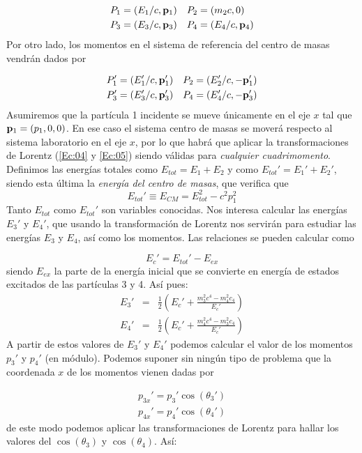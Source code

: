 \begin{eqnarray}
	P_1 = (E_1/c,\mathbf{p}_1) & \quad P_2 = (m_2c,0) \\
	P_3 = (E_3/c,\mathbf{p}_3) & \quad P_4 = (E_4/c,\mathbf{p}_4)
\end{eqnarray}
Por otro lado, los momentos en el sistema de referencia del centro de masas vendrán dados por

\begin{eqnarray}
	P_1' = (E_1'/c,\mathbf{p}_1') \quad P_2 = (E_2'/c,-\mathbf{p}_1') \\
	P_3' = (E_3'/c,\mathbf{p}_3') \quad P_4 = (E_4'/c,-\mathbf{p}_3')
\end{eqnarray}
Asumiremos que la partícula 1 incidente se mueve únicamente en el eje $x$ tal que $\mathbf{p}_1=(p_1,0,0)$. En ese caso el sistema centro de masas se moverá respecto al sistema laboratorio en el eje $x$, por lo que habrá que aplicar la transformaciones de Lorentz (\ref{Ec:04} y \ref{Ec:05}) siendo válidas para \textit{cualquier cuadrimomento}. Definimos las energías totales como $E_{tot}=E_1+E_2$ y como  $E_{tot}'=E_1'+E_2'$, siendo esta última la \textit{energía del centro de masas}, que verifica que
\begin{equation}
	E_{tot}' \equiv E_{CM} = E_{tot}^2 - c^2p_1^2 \label{Ec:18}
\end{equation}
Tanto $E_{tot}$ como $E_{tot}'$ son variables conocidas. Nos interesa calcular las energías $E_3'$ y $E_4'$, que usando la transformación de Lorentz nos servirán para estudiar las energías $E_3$ y $E_4$, así como los momentos. Las relaciones se pueden calcular como

\begin{equation}
	E_c' = E_{tot}' - E_{ex}
\end{equation}
siendo $E_{ex}$ la parte de la energía inicial que se convierte en energía de estados excitados de las partículas 3 y 4. Así pues:
\begin{eqnarray}
	E_3 ' & = & \frac{1}{2} \left( E_{c}' + \frac{m_3^2c^4- m_4^2c_4}{E_{c}'} \right) \\
	E_4 ' & = & \frac{1}{2} \left( E_{c}' + \frac{m_4^2c^4- m_3^2c_4}{E_{c}'} \right)
\end{eqnarray}
A partir de estos valores de $E_3'$ y $E_4'$ podemos calcular el valor de los momentos $p_3'$ y $p_4'$ (en módulo). Podemos suponer sin ningún tipo de problema que la coordenada $x$ de los momentos vienen dadas por

\begin{eqnarray}
	p_{3x}' = p_3' \cos (\theta_3') \\
	p_{4x}' = p_4' \cos (\theta_4')
\end{eqnarray}
de este modo podemos aplicar las transformaciones de Lorentz para hallar los valores del $\cos (\theta_3)$ y $\cos (\theta_4)$. Así:


